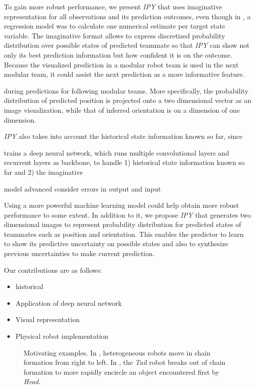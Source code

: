 \documentclass[letterpaper, 10 pt, conference]{ieeeconf}  %
\begin{document}
	To gain more robust performance, we present \emph{IPY} that uses imaginative representation 
	for all observations and its prediction outcomes, even though in \cite{Choi17}, 
	a regression model was to calculate one numerical estimate per target state variable. 
	The imaginative format allows to express discretized probability distribution 
	over possible states of predicted teammate so that \emph{IPY} can show not only its best
	prediction information but how confident it is on the outcome. Because the 
	visualized prediction in a modular robot team is used in the next modular team, 
	it could assist the next prediction as a more informative feature.  

	during predictions for following modular teams. More specifically, the probability 
	distribution of predicted position is projected onto a two dimensional vector as an image 
	visualization, while that of inferred orientation is on a dimension of one dimension. 
	
	\emph{IPY} also takes into account the historical state information known so far, 
	since 
	
	trains a deep neural network, which runs multiple convolutional layers and 
	recurrent layers as backbone, to handle 1) historical state information known so far and
	2) the imaginative   
	
	
	model advanced 
	consider errors in output and input
	
	Using a more powerful machine learning model could help obtain more robust performance
	to some extent. In addition to it, we propose \emph{IPY} that generates two dimensional 
	images to represent probability distribution for predicted states of teammates such as 
	position and orientation. 
	This enables the predictor to learn to show its predictive uncertainty on possible 
	states and also to synthesize previous uncertainties to make current prediction. 
	
	Our contributions are as follows: 
	\begin{itemize}
		\item historical 
		\item Application of deep neural network 
		\item Visual representation 
		\item Physical robot implementation 
	\end{itemize}
	
	\begin{figure}\centering
		\caption{Motivating examples.
			In \protect{}, heterogeneous robots move in
			chain formation from right to left. In
			\protect{}, the \emph{Tail} robot breaks
			out of chain formation to more rapidly encircle an object
			encountered first by \emph{Head}.
		}
		\label{fig:SampleChains}
	\end{figure}
	
\end{document}
